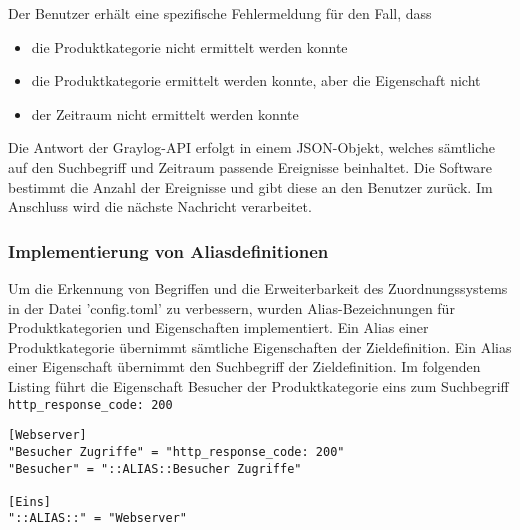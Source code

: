 Der Benutzer erhält eine spezifische Fehlermeldung für den Fall, dass

\begin{itemize}
\item die Produktkategorie nicht ermittelt werden konnte
\item die Produktkategorie ermittelt werden konnte, aber die Eigenschaft nicht
\item der Zeitraum nicht ermittelt werden konnte
\end{itemize}

Die Antwort der Graylog-API erfolgt in einem JSON-Objekt, welches sämtliche auf den Suchbegriff und Zeitraum passende Ereignisse beinhaltet. Die Software bestimmt die Anzahl der Ereignisse und gibt diese an den Benutzer zurück. Im Anschluss wird die nächste Nachricht verarbeitet.

\subsubsection{Implementierung von Aliasdefinitionen}

Um die Erkennung von Begriffen und die Erweiterbarkeit des Zuordnungssystems in der Datei 'config.toml' zu verbessern, wurden Alias-Bezeichnungen für Produktkategorien und Eigenschaften implementiert. Ein Alias einer Produktkategorie übernimmt sämtliche Eigenschaften der Zieldefinition. Ein Alias einer Eigenschaft übernimmt den Suchbegriff der Zieldefinition. Im folgenden Listing führt die Eigenschaft Besucher der Produktkategorie eins zum Suchbegriff \lstinline{http_response_code: 200}

\begin{lstlisting}[caption={Aliasdefinitionen in der Datei config.toml}, label=alias-config-toml, xleftmargin=6mm]
[Webserver]
"Besucher Zugriffe" = "http_response_code: 200"
"Besucher" = "::ALIAS::Besucher Zugriffe"

[Eins]
"::ALIAS::" = "Webserver"
\end{lstlisting}

